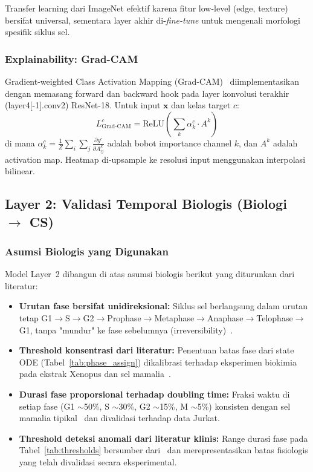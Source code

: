 \documentclass[conference]{IEEEtran}
\begin{document}
Transfer learning dari ImageNet efektif karena fitur low-level (edge, texture) bersifat universal, sementara layer akhir di-\textit{fine-tune} untuk mengenali morfologi spesifik siklus sel.

\subsubsection{Explainability: Grad-CAM}
Gradient-weighted Class Activation Mapping (Grad-CAM)~\cite{selvaraju2017} diimplementasikan dengan memasang forward dan backward hook pada layer konvolusi terakhir (layer4[-1].conv2) ResNet-18. Untuk input $\mathbf{x}$ dan kelas target $c$:
\begin{equation}
    L^c_{\text{Grad-CAM}} = \text{ReLU}\left(\sum_k \alpha^c_k \cdot A^k\right)
\end{equation}
di mana $\alpha^c_k = \frac{1}{Z}\sum_i\sum_j \frac{\partial y^c}{\partial A^k_{ij}}$ adalah bobot importance channel $k$, dan $A^k$ adalah activation map. Heatmap di-upsample ke resolusi input menggunakan interpolasi bilinear.

\subsection{Layer 2: Validasi Temporal Biologis (Biologi $\rightarrow$ CS)}

\subsubsection{Asumsi Biologis yang Digunakan}
Model Layer~2 dibangun di atas asumsi biologis berikut yang diturunkan dari literatur:
\begin{itemize}[noitemsep,topsep=3pt]
    \item \textbf{Urutan fase bersifat unidireksional:} Siklus sel berlangsung dalam urutan tetap G1$\rightarrow$S$\rightarrow$G2$\rightarrow$Prophase$\rightarrow$Metaphase$\rightarrow$Anaphase$\rightarrow$Telophase$\rightarrow$G1, tanpa "mundur" ke fase sebelumnya (irreversibility)~\cite{morgan2007}.
    \item \textbf{Threshold konsentrasi dari literatur:} Penentuan batas fase dari state ODE (Tabel~\ref{tab:phase_assign}) dikalibrasi terhadap eksperimen biokimia pada ekstrak Xenopus dan sel mamalia~\cite{tyson2001}.
    \item \textbf{Durasi fase proporsional terhadap doubling time:} Fraksi waktu di setiap fase (G1 $\sim$50\%, S $\sim$30\%, G2 $\sim$15\%, M $\sim$5\%) konsisten dengan sel mamalia tipikal~\cite{morgan2007} dan divalidasi terhadap data Jurkat.
    \item \textbf{Threshold deteksi anomali dari literatur klinis:} Range durasi fase pada Tabel~\ref{tab:thresholds} bersumber dari~\cite{alberts2022,morgan2007} dan merepresentasikan batas fisiologis yang telah divalidasi secara eksperimental.
\end{itemize}
\end{document}
